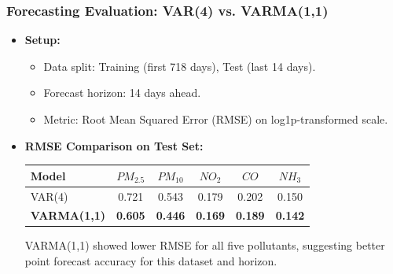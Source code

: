 \documentclass[svgnames, 12pt]{beamer}
\begin{document}
\begin{frame}
    \frametitle{Forecasting Evaluation: VAR(4) vs. VARMA(1,1)}
    \begin{itemize}
        \item \textbf{Setup:}
            \begin{itemize}
                \item Data split: Training (first 718 days), Test (last 14 days).
                \item Forecast horizon: 14 days ahead.
                \item Metric: Root Mean Squared Error (RMSE) on log1p-transformed scale.
            \end{itemize}
        \item \textbf{RMSE Comparison on Test Set:}
            \begin{center}
            \footnotesize
            \begin{tabular}{lccccc}
                \toprule
                Model      & $PM_{2.5}$ & $PM_{10}$ & $NO_2$ & $CO$  & $NH_3$ \\
                \midrule
                VAR(4)     & 0.721      & 0.543     & 0.179  & 0.202 & 0.150  \\
                \textbf{VARMA(1,1)} & \textbf{0.605} & \textbf{0.446} & \textbf{0.169} & \textbf{0.189} & \textbf{0.142} \\
                \bottomrule
            \end{tabular}
            \end{center}
            \vspace{0.2cm}
            \rightarrow VARMA(1,1) showed lower RMSE for all five pollutants, suggesting better point forecast accuracy for this dataset and horizon.
    \end{itemize}
\end{frame}
\end{document}
